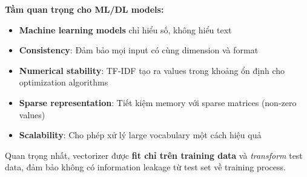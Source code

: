 \noindent\textbf{Tầm quan trọng cho ML/DL models:}
\begin{itemize}
    \item \textbf{Machine learning models} chỉ hiểu số, không hiểu text
    \item \textbf{Consistency}: Đảm bảo mọi input có cùng dimension và format
    \item \textbf{Numerical stability}: TF-IDF tạo ra values trong khoảng ổn định cho optimization algorithms
    \item \textbf{Sparse representation}: Tiết kiệm memory với sparse matrices (non-zero values)
    \item \textbf{Scalability}: Cho phép xử lý large vocabulary một cách hiệu quả
\end{itemize}

\noindent Quan trọng nhất, vectorizer được \textbf{fit chỉ trên training data} và \textit{transform} test data, đảm bảo không có information leakage từ test set về training process.